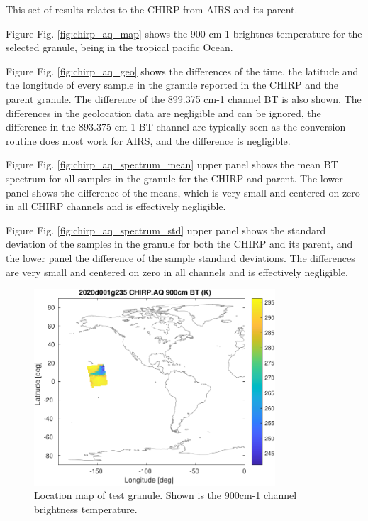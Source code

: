 \documentclass[11pt]{article}
\begin{document}
This set of results relates to the CHIRP from AIRS and its parent.

Figure Fig. \ref{fig:chirp_aq_map} shows the 900 cm-1 brightnes temperature for the selected granule, being in the tropical pacific Ocean.

Figure Fig. \ref{fig:chirp_aq_geo} shows the differences of the time, the latitude and the longitude of every sample in the granule  reported in the CHIRP and the parent granule. The difference of the 899.375 cm-1 channel BT is also shown. The differences in the geolocation data are negligible and can be ignored, the difference in the 893.375 cm-1 BT channel are typically seen as the conversion routine does most work for AIRS, and the difference is negligible.

Figure Fig. \ref{fig:chirp_aq_spectrum_mean} upper panel shows the mean BT spectrum for all samples in the granule for the CHIRP and parent. The lower panel shows the difference of the means, which is very small and centered on zero in all CHIRP channels and is effectively negligible.

Figure Fig. \ref{fig:chirp_aq_spectrum_std} upper panel shows the standard deviation of the samples in the granule for both the CHIRP and its parent, and the lower panel the difference of the sample standard deviations. The differences are very small and centered on zero in all channels and is effectively negligible.

\begin{figure}[htbp]
\centering
\includegraphics[angle=0,width=9cm]{./figs/2020d001g235_chirp_aq_900cm_bt_map.pdf}
\caption{\label{fig:orgd919374}
Location map of test granule. Shown is the 900cm-1 channel brightness temperature.}
\end{figure}
\end{document}
